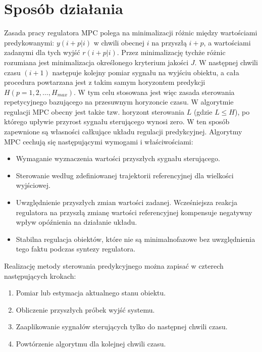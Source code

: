 \section{Sposób działania} \label{sec:howitworks}
Zasada pracy regulatora MPC polega na minimalizacji różnic między wartościami predykowanymi:
$y(i+p|i)$ w chwili obecnej $i$ na przyszłą $i+p$, a wartościami zadanymi dla tych wyjść $r(i+p|i)$.
Przez minimalizację tychże różnic rozumiana jest minimalizacja określonego kryterium jakości $J$. W
następnej chwili czasu $(i+1)$ następuje kolejny pomiar sygnału na wyjściu obiektu, a cała procedura
powtarzana jest z takim samym horyzontem predykcji $H(p=1,2,\dots ,H_{max})$. W tym celu stosowana jest
więc zasada sterowania repetycyjnego bazującego na przesuwnym horyzoncie czasu. W algorytmie regulacji MPC
obecny jest także tzw. horyzont sterowania $L$ (gdzie $L \leqslant H$), po którego upływie przyrost sygnału
sterującego wynosi zero. W ten sposób zapewnione są własności całkujące układu regulacji predykcyjnej.
\newline Algorytmy MPC cechują się następującymi wymogami i właściwościami:
\begin{itemize}
	\item Wymaganie wyznaczenia wartości przyszłych sygnału sterującego.
	\item Sterowanie według zdefiniowanej trajektorii referencyjnej dla wielkości wyjściowej.
    \item Uwzględnienie przyszłych zmian wartości zadanej. Wcześniejsza reakcja regulatora na 
    przyszłą zmianę wartości referencyjnej kompensuje negatywny wpływ opóźnienia na działanie układu.
	\item Stabilna regulacja obiektów, które nie są minimalnofazowe bez uwzględnienia tego faktu podczas
    syntezy regulatora.
\end{itemize}
Realizację metody sterowania predykcyjnego można zapisać w czterech następujących krokach:
\begin{enumerate}
    \item Pomiar lub estymacja aktualnego stanu obiektu.
    \item Obliczenie przyszłych próbek wyjść systemu.
    \item Zaaplikowanie sygnałów sterujących tylko do następnej chwili czasu.
    \item Powtórzenie algorytmu dla kolejnej chwili czasu.
\end{enumerate}


